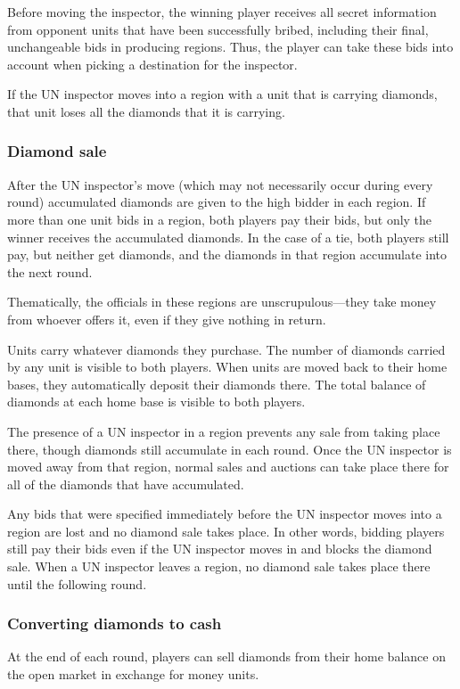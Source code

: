 \documentclass[8pt]{extarticle}
\begin{document}
Before moving the inspector, the winning player receives all secret information from opponent units that have been successfully bribed, including their final, unchangeable bids in producing regions.  Thus, the player can take these bids into account when picking a destination for the inspector.

If the UN inspector moves into a region with a unit that is carrying diamonds, that unit loses all the diamonds that it is carrying.


\subsubsection{Diamond sale}
After the UN inspector's move (which may not necessarily occur during every round) accumulated diamonds are given to the high bidder in each region.  If more than one unit bids in a region, both players pay their bids, but only the winner receives the accumulated diamonds.  In the case of a tie, both players still pay, but neither get diamonds, and the diamonds in that region accumulate into the next round.

Thematically, the officials in these regions are unscrupulous---they take money from whoever offers it, even if they give nothing in return.

Units carry whatever diamonds they purchase.  The number of diamonds carried by any unit is visible to both players.  When units are moved back to their home bases, they automatically deposit their diamonds there.  The total balance of diamonds at each home base is visible to both players.

The presence of a UN inspector in a region prevents any sale from taking place there, though diamonds still accumulate in each round.  Once the UN inspector is moved away from that region, normal sales and auctions can take place there for all of the diamonds that have accumulated.

Any bids that were specified immediately before the UN inspector moves into a region are lost and no diamond sale takes place.  In other words, bidding players still pay their bids even if the UN inspector moves in and blocks the diamond sale.  When a UN inspector leaves a region, no diamond sale takes place there until the following round.

\subsubsection{Converting diamonds to cash}
At the end of each round, players can sell diamonds from their home balance on the open market in exchange for money units.  
\end{document}

